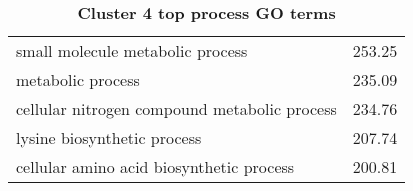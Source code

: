 \begin{table}[hp]
\begin{center}
\begin{tabular}{p{}r}
small molecule metabolic process                              & 253.25                      \\
metabolic process                                             & 235.09                      \\
cellular nitrogen compound metabolic process                  & 234.76                      \\
lysine biosynthetic process                                   & 207.74                      \\
cellular amino acid biosynthetic process                      & 200.81                      \\ \bottomrule                                                           
\end{tabular}
\end{center}

\caption[Cluster 4 top process GO terms]{\sf \textbf{Cluster 4 top process GO terms}}
\label{tab:cls4-process}
\end{table}
